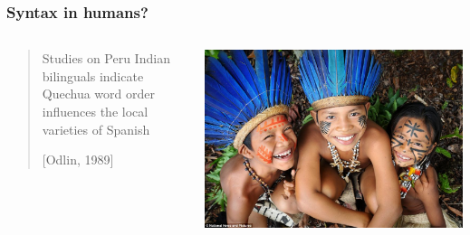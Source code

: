 \documentclass[mathserif,12pt]{beamer}
\begin{document}
\begin{frame}
\frametitle{Syntax in humans?}
\begin{center}
\begin{columns}
\begin{column}{0.7\textwidth}
  \begin{quote}
   Studies on Peru Indian bilinguals indicate Quechua word order influences the local varieties of Spanish
   
   [Odlin, 1989]
  \end{quote}
\end{column}
\begin{column}{0.3\textwidth}
  \begin{center}
   \includegraphics[width=\textwidth]{figures/amazon-tribes}
  \end{center}
\end{column}
\end{columns}
\vspace{0.5cm}
\begin{columns}

\begin{column}{0.3\textwidth}
   
\end{column}
\end{columns}
\end{center}
\end{frame}
\end{document}
